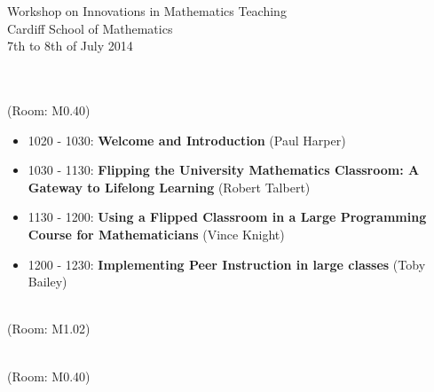 \documentclass{article}
\begin{document}



\begin{center}
    {\Huge Workshop on Innovations in Mathematics Teaching}\\
    {\tiny Cardiff School of Mathematics}\\
    {\tiny 7th to 8th of July 2014}\\
    \vspace{1cm}
    {}\\
\end{center}

\vspace{1cm}

\begin{center}
    \\
    \tiny{(Room: M0.40)}
\end{center}

\begin{itemize}
    \item 1020 - 1030: \textbf{Welcome and Introduction} (Paul Harper)
    \item 1030 - 1130: \textbf{Flipping the University Mathematics Classroom: A Gateway to Lifelong Learning} (Robert Talbert)
    \item 1130 - 1200: \textbf{Using a Flipped Classroom in a Large Programming Course for Mathematicians} (Vince Knight)
    \item 1200 - 1230: \textbf{Implementing Peer Instruction in large classes} (Toby Bailey)
\end{itemize}

\vspace{.5cm}

\begin{center}
    \\
    \tiny{(Room: M1.02)}
\end{center}

\vspace{.5cm}

\begin{center}
    \\
    \tiny{(Room: M0.40)}
\end{center}
\end{document}

